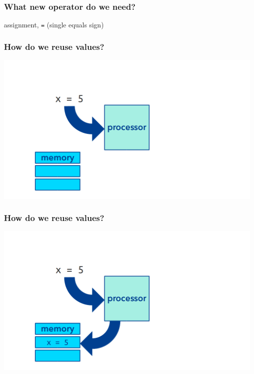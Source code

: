 \documentclass[11pt]{beamer}
\begin{document}
\begin{frame}
  \frametitle{What new operator do we need?}
  \Enlarge

  \begin{itemize}
  \myitem  assignment, \texttt{=} (single equals sign)
  \end{itemize}
\end{frame}

\begin{frame}
  \frametitle{How do we reuse values?}
  \includegraphics[width=\textwidth]{./img/computer-memory-1.png}
\end{frame}

\begin{frame}
  \frametitle{How do we reuse values?}
  \includegraphics[width=\textwidth]{./img/computer-memory-2.png}
\end{frame}
\end{document}
